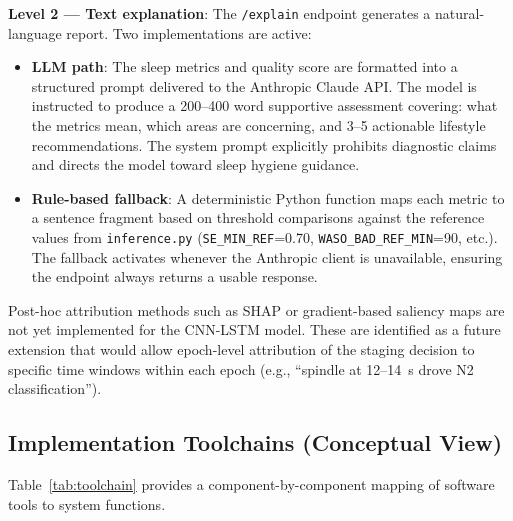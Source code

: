 \documentclass[10pt]{article}
\begin{document}
\textbf{Level 2 --- Text explanation}: The \texttt{/explain} endpoint generates a natural-language report. Two implementations are active:
\begin{itemize}
  \item \textbf{LLM path}: The sleep metrics and quality score are formatted into a structured prompt delivered to the Anthropic Claude API. The model is instructed to produce a 200--400 word supportive assessment covering: what the metrics mean, which areas are concerning, and 3--5 actionable lifestyle recommendations. The system prompt explicitly prohibits diagnostic claims and directs the model toward sleep hygiene guidance.
  \item \textbf{Rule-based fallback}: A deterministic Python function maps each metric to a sentence fragment based on threshold comparisons against the reference values from \texttt{inference.py} (\texttt{SE\_MIN\_REF}=0.70, \texttt{WASO\_BAD\_REF\_MIN}=90, etc.). The fallback activates whenever the Anthropic client is unavailable, ensuring the endpoint always returns a usable response.
\end{itemize}

Post-hoc attribution methods such as SHAP or gradient-based saliency maps are not yet implemented for the CNN-LSTM model. These are identified as a future extension that would allow epoch-level attribution of the staging decision to specific time windows within each epoch (e.g., ``spindle at 12--14~s drove N2 classification'').

\subsection{Implementation Toolchains (Conceptual View)}
\label{sec:toolchain}

Table~\ref{tab:toolchain} provides a component-by-component mapping of software tools to system functions.
\end{document}
